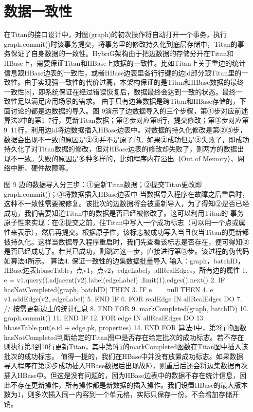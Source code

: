 \section{数据一致性}
在Titan的接口设计中，对图(graph)的初次操作将自动打开一个事务，执行graph.commit()时该事务提交，将事务里的修改持久化到底层存储中，Titan的事务保证了自身数据的一致性。HybriG架构由于把边数据的存储分开在Titan和HBase上，需要保证Titan和HBase上数据的一致性。比如Titan上关于重边的统计信息跟HBase边表的一致性，或者HBase边表里各行行键的边id部分跟Titan里的一致性。由于实现强一致性的代价过高，本架构保证的是Titan和HBase数据的最终一致性[8]，即系统保证在经过错误恢复后，数据最终会达到一致的状态。最终一致性足以满足应用场景的需求。
由于只有边集数据是跨Titan和HBase存储的，下面讨论的都是边数据的导入。图 9演示了边数据导入的三个步骤，第①步对应前述算法3中的第1~7行，更新Titan数据；第②步对应第8行，提交修改；第③步对应第9~11行，利用边id将边数据插入HBase边表中。对数据的持久化修改是第②③步，数据会出现不一致的原因是②③并不是原子的。如果②成功但是③失败了，即成功持久化了对Titan数据的修改，但对HBase边表的修改却失败了，则两方的数据出现不一致。失败的原因是多种多样的，比如程序内存溢出（Out of Memory）、网络中断、硬件故障等。
 
图 9	边的数据导入分三步：①更新Titan数据；②提交Titan更改即graph.commit()；③将数据插入HBase边表中
当数据导入程序在故障之后重启时，这种不一致性需要被修复。该批次的边数据将会被重新导入，为了得知②是否已经成功，我们需要知道Titan中的数据是否已经被修改了。这可以利用Titan的
事务原子性来实现：在②提交之前，往Titan中写入一个成功标志（可以用一个点或属性来表示），然后再提交。根据原子性，该标志被成功写入当且仅当Titan的更新都被持久化。这样当数据导入程序重启时，我们先查看该标志是否存在，便可得知②是否已经成功了。若其已成功，则跳过这一步，直接进行第③步。该过程的伪代码如算法4所示。
算法4.	保证一致性的边集数据批量导入
输入：graph，batchID，HBase边表hbaseTable，点v1，点v2，edgeLabel，allRealEdges，所有边的属性
1.	e = v1.query().adjacent(v2).label(edgeLabel)
.limit(1).edges().next()
2.	IF hasNotCompleted(graph, batchID) THEN
3.	    IF e == null THEN
4.	        e = v1.addEdge(v2, edgeLabel)
5.	    END IF
6.	    FOR realEdge IN allRealEdges DO
7.	        // 按需更新边上的统计信息
8.	    END FOR
9.	    markCompleted(graph, batchID)
10.	    graph.commit()
11.	END IF
12.	FOR edge IN allRealEdges DO
13.	    hbaseTable.put(e.id + edge.pk, properties)
14.	END FOR
算法4中，第2行的函数hasNotCompleted判断给定的Titan图中是否存在给定批次的成功标志。若不存在则执行第3到10行更新Titan，其中第9行的markCompleted函数在Titan图中插入该批次的成功标志。
值得一提的，我们在HBase中并没有放置成功标志。如果数据导入程序在第③步成功插入HBase数据后出现故障，则重启后还会将边集数据再次插入HBase中。但这是没有问题的，因为HBase边表中的数据不存在统计信息，因此不存在更新操作，所有操作都是新数据的插入操作。我们设置HBase的最大版本数为1，则多次插入同一内容到一个单元格，实际只保存一份，不会增加存储开销。


